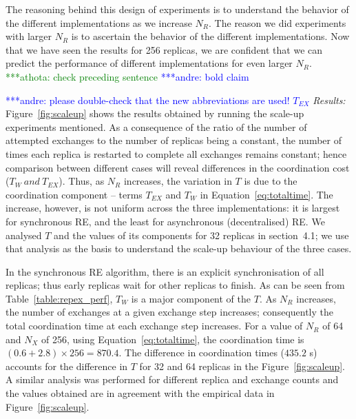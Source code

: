 \documentclass{rspublic}
\newcommand{\jhanote}[1]{ {\textcolor{red} { ***shantenu: #1 }}}
\newcommand{\alnote}[1]{ {\textcolor{blue} { ***andre: #1 }}}
\newcommand{\athotanote}[1]{ {\textcolor{green} { ***athota: #1 }}}
\newcommand{\alnote}[1]{}
\newcommand{\athotanote}[1]{}
\newcommand{\jhanote}[1]{}
\begin{document}
The reasoning behind this design of experiments is to understand the
behavior of the different implementations as we increase
$N_R$. %
The reason we did experiments with larger $N_R$ is to ascertain the
behavior of the different implementations. Now that we have seen the
results for 256 replicas, we are confident that we can predict the
performance of different implementations for even larger
$N_R$. \athotanote{check preceding sentence} \alnote{bold claim}


\alnote{please double-check that the new abbreviations are used! $T_{EX}$}
{\it Results:} Figure~\ref{fig:scaleup} shows the results obtained by
running the scale-up experiments mentioned.  %
As a consequence of the ratio of the number of attempted exchanges to the number
of replicas being a constant, the number of times each replica is restarted to complete all exchanges remains constant; hence comparison between
different cases will reveal differences in the coordination cost ($T_W
~and~T_{EX}$).  Thus, as $N_R$ increases, the variation in $T$ is due to
the coordination component -- terms $T_{EX}$ and $T_W$ in
Equation~\ref{eq:totaltime}.  The increase, however, is not uniform
across the three implementations: it is largest for
synchronous RE, and the least for asynchronous (decentralised) RE.  We
analysed $T$ and the values of its components for 32 replicas in
section~4.1; we use that analysis as the basis to understand the scale-up
behaviour of the three cases.
 
In the synchronous RE algorithm, there is an explicit synchronisation
of all replicas; thus early replicas wait for other replicas to
finish. As can be seen from Table~\ref{table:repex_perf}, $T_W$ is a
major component of the $T$.  As $N_R$ increases, the number of
exchanges at a given exchange step increases; consequently the total
coordination time at each exchange step increases.  For a value of
$N_R$ of 64 and $N_X$ of 256, using Equation~\ref{eq:totaltime}, the
coordination time is $(0.6+2.8) \times 256 = 870.4$.  The difference
in coordination times ($435.2$ s) accounts for the difference
in $T$ for 32 and 64 replicas in the
Figure~\ref{fig:scaleup}. %
A similar analysis was performed for different replica and exchange
counts and the values obtained are in agreement with the empirical
data in Figure~\ref{fig:scaleup}.
\end{document}
